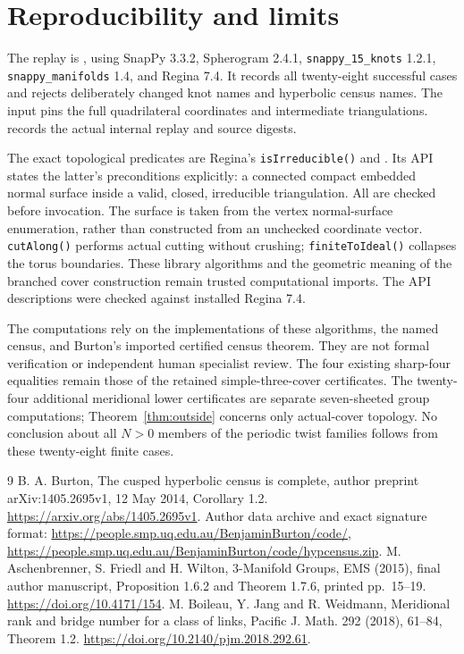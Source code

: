 \documentclass[11pt]{article}
\begin{document}
\section{Reproducibility and limits}

The replay is , using
SnapPy 3.3.2, Spherogram 2.4.1,
\texttt{snappy\_15\_knots} 1.2.1,
\texttt{snappy\_manifolds} 1.4, and Regina 7.4.
It records all twenty-eight successful cases and rejects deliberately changed
knot names and hyperbolic census names.
The input pins the full quadrilateral coordinates and intermediate
triangulations.  records the
actual internal replay and source digests.

The exact topological predicates are Regina's \texttt{isIrreducible()}
and . Its API states the latter's
preconditions explicitly: a connected compact embedded normal surface
inside a valid, closed, irreducible triangulation.
All are checked before invocation. The surface is taken from the vertex
normal-surface enumeration, rather than constructed from an unchecked
coordinate vector. \texttt{cutAlong()} performs actual cutting without
crushing; \texttt{finiteToIdeal()} collapses the torus boundaries.
These library algorithms and the geometric meaning of the branched
cover construction remain trusted computational imports.
The API descriptions were checked against installed Regina 7.4.

The computations rely on the implementations of these algorithms, the
named census, and Burton's imported certified census theorem.
They are not formal verification or independent human specialist review.
The four existing sharp-four equalities remain those of the retained
simple-three-cover certificates. The twenty-four additional meridional
lower certificates are separate seven-sheeted group computations;
Theorem~\ref{thm:outside} concerns only actual-cover topology.
No conclusion about all $N>0$ members of the periodic twist families
follows from these twenty-eight finite cases.

\begin{thebibliography}{9}
B. A. Burton, The cusped hyperbolic census is complete,
author preprint arXiv:1405.2695v1, 12 May 2014, Corollary 1.2.
\url{https://arxiv.org/abs/1405.2695v1}.
Author data archive and exact signature format:
\url{https://people.smp.uq.edu.au/BenjaminBurton/code/},
\url{https://people.smp.uq.edu.au/BenjaminBurton/code/hypcensus.zip}.
M. Aschenbrenner, S. Friedl and H. Wilton,
3-Manifold Groups, EMS (2015), final author manuscript,
Proposition 1.6.2 and Theorem 1.7.6, printed pp.~15--19.
\url{https://doi.org/10.4171/154}.
M. Boileau, Y. Jang and R. Weidmann,
Meridional rank and bridge number for a class of links,
Pacific J. Math. 292 (2018), 61--84, Theorem 1.2.
\url{https://doi.org/10.2140/pjm.2018.292.61}.
\end{thebibliography}
\end{document}
